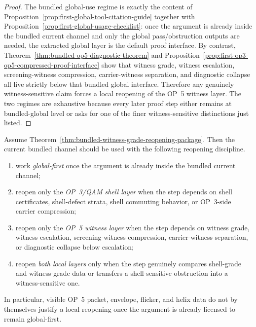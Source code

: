\begin{proof}
The bundled global-use regime is exactly the content of Proposition~\ref{prop:first-global-tool-citation-guide} together with Proposition~\ref{prop:first-global-usage-checklist}: once the argument is already inside the bundled current channel and only the global pass/obstruction outputs are needed, the extracted global layer is the default proof interface. By contrast, Theorem~\ref{thm:bundled-op5-diagnostic-theorem} and Proposition~\ref{prop:first-op3-op5-compressed-proof-interface} show that witness grade, witness escalation, screening-witness compression, carrier-witness separation, and diagnostic collapse all live strictly below that bundled global interface. Therefore any genuinely witness-sensitive claim forces a local reopening of the OP~5 witness layer. The two regimes are exhaustive because every later proof step either remains at bundled-global level or asks for one of the finer witness-sensitive distinctions just listed.
\end{proof}

\begin{proposition}
\label{prop:witness-grade-local-global-reopening-discipline}
Assume Theorem~\ref{thm:bundled-witness-grade-reopening-package}. Then the current bundled channel should be used with the following reopening discipline.
\begin{enumerate}[leftmargin=2em,label=(\roman*)]
\item work \emph{global-first} once the argument is already inside the bundled current channel;
\item reopen only the \emph{OP~3/QAM shell layer} when the step depends on shell certificates, shell-defect strata, shell commuting behavior, or OP~3-side carrier compression;
\item reopen only the \emph{OP~5 witness layer} when the step depends on witness grade, witness escalation, screening-witness compression, carrier-witness separation, or diagnostic collapse below escalation;
\item reopen \emph{both local layers} only when the step genuinely compares shell-grade and witness-grade data or transfers a shell-sensitive obstruction into a witness-sensitive one.
\end{enumerate}
In particular, visible OP~5 packet, envelope, flicker, and helix data do not by themselves justify a local reopening once the argument is already licensed to remain global-first.
\end{proposition}

